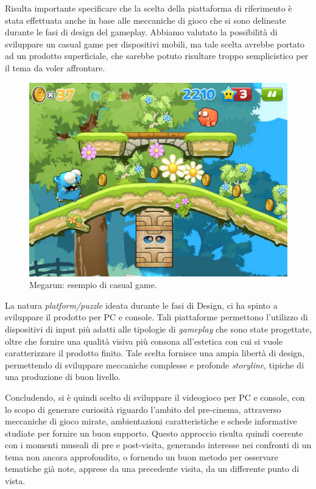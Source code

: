 Risulta importante specificare che la scelta della piattaforma di riferimento è stata effettuata anche in base alle meccaniche di gioco che si sono delineate durante le fasi di design del gameplay.
Abbiamo valutato la possibilità di sviluppare un casual game per dispositivi mobili, ma tale scelta avrebbe portato ad un prodotto superficiale, che sarebbe potuto risultare troppo semplicistico per il tema da voler affrontare.

\begin{figure}%
	\centering
	\includegraphics[width= 0.8\columnwidth]{images/gameDesign/01_megarun.jpg}
	\caption{Megarun: esempio di casual game.}
	\label{fig:casual_game}
\end{figure}

La natura \textit{platform/puzzle} ideata durante le fasi di Design, ci ha spinto a sviluppare il prodotto per PC e console. Tali piattaforme permettono l’utilizzo di dispositivi di input più adatti alle tipologie di \textit{gameplay} che sono state progettate, oltre che fornire una qualità visiva più consona all’estetica con cui si vuole caratterizzare il prodotto finito.
Tale scelta fornisce una ampia libertà di design, permettendo di sviluppare meccaniche complesse e profonde \textit{storyline}, tipiche di una produzione di buon livello.

Concludendo, si è quindi scelto di sviluppare il videogioco per PC e console, con lo scopo di generare curiosità riguardo l’ambito del pre-cinema, attraverso meccaniche di gioco mirate, ambientazioni caratteristiche e schede informative studiate per fornire un buon supporto. Questo approccio risulta quindi coerente con i momenti museali di pre e post-visita, generando interesse nei confronti di un tema non ancora approfondito, o fornendo un buon metodo per osservare tematiche già note, apprese da una precedente visita, da un differente punto di vista.

